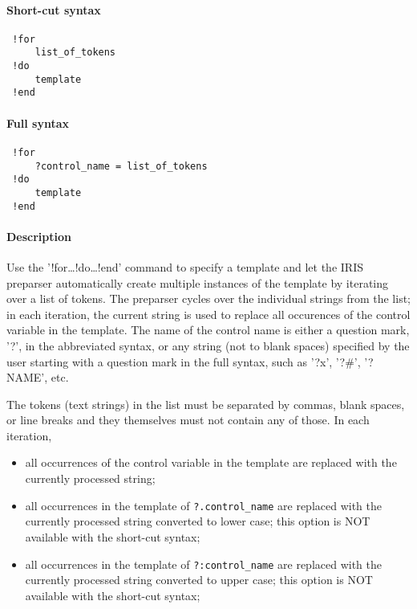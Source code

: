 


	\paragraph{Short-cut syntax}
 
 \begin{verbatim}
 !for
     list_of_tokens
 !do
     template
 !end
 \end{verbatim}
 
 \paragraph{Full syntax}
 
 \begin{verbatim}
 !for
     ?control_name = list_of_tokens
 !do
     template
 !end
 \end{verbatim}
 
 \paragraph{Description}
 
 Use the '!for\ldots{}!do\ldots{}!end' command to specify a template and
 let the IRIS preparser automatically create multiple instances of the
 template by iterating over a list of tokens. The preparser cycles over
 the individual strings from the list; in each iteration, the current
 string is used to replace all occurences of the control variable in the
 template. The name of the control name is either a question mark, '?',
 in the abbreviated syntax, or any string (not to blank spaces) specified
 by the user starting with a question mark in the full syntax, such as
 '?x', '?\#', '?NAME', etc.
 
 The tokens (text strings) in the list must be separated by commas, blank
 spaces, or line breaks and they themselves must not contain any of
 those. In each iteration,
 
 \begin{itemize}
 \item
   all occurrences of the control variable in the template are replaced
   with the currently processed string;
 \item
   all occurrences in the template of \texttt{?.control\_name} are
   replaced with the currently processed string converted to lower case;
   this option is NOT available with the short-cut syntax;
 \item
   all occurrences in the template of \texttt{?:control\_name} are
   replaced with the currently processed string converted to upper case;
   this option is NOT available with the short-cut syntax;
 \end{itemize}
 

